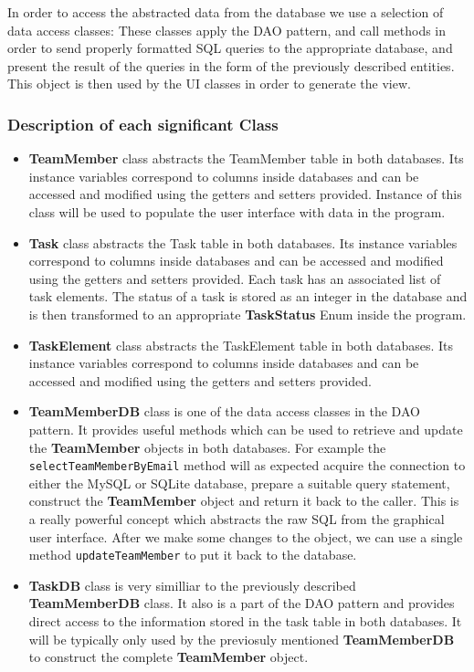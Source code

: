 \documentclass{project}
\begin{document}
  In order to access the abstracted data from the database we use a selection of data access classes:
  These classes apply the DAO pattern, and call methods in order to send properly formatted SQL queries to the appropriate database, and present the result of the queries in the form of the previously described entities. 
  This object is then used by the UI classes in order to generate the view.

  \subsubsection{Description of each significant Class}

  \begin{itemize}
  		\item \textbf{TeamMember} class abstracts the TeamMember table in both databases. Its instance variables correspond to columns inside 
  		databases and can be accessed and modified using the getters and setters provided. Instance of this class will be used to populate
  		the user interface with data in the program.
  		\item \textbf{Task} class abstracts the Task table in both databases. Its instance variables correspond to columns inside 
  		databases and can be accessed and modified using the getters and setters provided. Each task has an associated list of task elements. The status of a task is stored as an integer in the database and is then transformed to an appropriate \textbf{TaskStatus} Enum inside the program.
  		\item \textbf{TaskElement} class abstracts the TaskElement table in both databases. Its instance variables correspond to columns inside 
  		databases and can be accessed and modified using the getters and setters provided. 
  		\item \textbf{TeamMemberDB} class is one of the data access classes in the DAO pattern. It provides useful methods which can be used to retrieve and update the \textbf{TeamMember} objects in both databases. For example the \texttt{selectTeamMemberByEmail} method will as expected acquire the connection to either the MySQL or SQLite database, prepare a suitable query statement, construct the \textbf{TeamMember}
  		object and return it back to the caller. This is a really powerful concept which abstracts the raw SQL from the graphical user interface. After we make some changes to the object, we can use a single method \texttt{updateTeamMember} to put it back to the database. 
  		\item \textbf{TaskDB} class is very similliar to the previously described \textbf{TeamMemberDB} class. It also is a part of the DAO pattern and provides direct access to the information stored in the task table in both databases. It will be typically only used by the previosuly mentioned \textbf{TeamMemberDB} to construct the complete \textbf{TeamMember} object.

\end{itemize}
\end{document}
